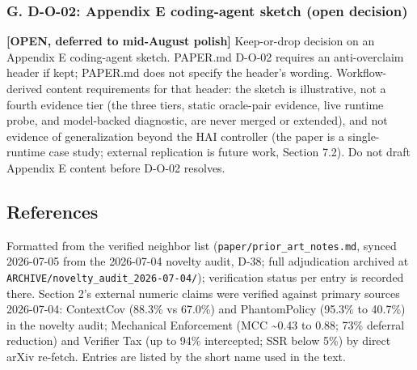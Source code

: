 \documentclass[
]{article}
\begin{document}
\subsubsection{G. D-O-02: Appendix E coding-agent sketch (open
decision)}\label{g.-d-o-02-appendix-e-coding-agent-sketch-open-decision}

\textbf{{[}OPEN, deferred to mid-August polish{]}} Keep-or-drop decision
on an Appendix E coding-agent sketch. PAPER.md D-O-02 requires an
anti-overclaim header if kept; PAPER.md does not specify the header's
wording. Workflow-derived content requirements for that header: the
sketch is illustrative, not a fourth evidence tier (the three tiers,
static oracle-pair evidence, live runtime probe, and model-backed
diagnostic, are never merged or extended), and not evidence of
generalization beyond the HAI controller (the paper is a single-runtime
case study; external replication is future work, Section 7.2). Do not
draft Appendix E content before D-O-02 resolves.

\subsection{References}\label{references}

Formatted from the verified neighbor list
(\texttt{paper/prior\_art\_notes.md}, synced 2026-07-05 from the
2026-07-04 novelty audit, D-38; full adjudication archived at
\texttt{ARCHIVE/novelty\_audit\_2026-07-04/}); verification status per
entry is recorded there. Section 2's external numeric claims were
verified against primary sources 2026-07-04: ContextCov (88.3\% vs
67.0\%) and PhantomPolicy (95.3\% to 40.7\%) in the novelty audit;
Mechanical Enforcement (MCC \textasciitilde0.43 to 0.88; 73\% deferral
reduction) and Verifier Tax (up to 94\% intercepted; SSR below 5\%) by
direct arXiv re-fetch. Entries are listed by the short name used in the
text.
\end{document}
